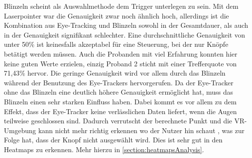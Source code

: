 Blinzeln scheint als Auswahlmethode dem Trigger unterlegen zu sein. Mit dem Laserpointer war die Genauigkeit zwar noch ähnlich hoch, allerdings ist die Kombination aus Eye-Tracking und Blinzeln sowohl in der Gesamtdauer, als auch in der Genauigkeit signifikant schlechter. Eine durchschnittliche Genauigkeit von unter 50\% ist keinesfalls akzeptabel für eine Steuerung, bei der nur Knöpfe betätigt werden müssen. Auch die Probanden mit viel Erfahrung konnten hier keine guten Werte erzielen, einzig Proband 2 sticht mit einer Trefferquote von 71,43\% hervor. Die geringe Genauigkeit wird vor allem durch das Blinzeln während der Benutzung des Eye-Trackers hervorgerufen. Da der Eye-Tracker ohne das Blinzeln eine deutlich höhere Genauigkeit ermöglicht hat, muss das Blinzeln einen sehr starken Einfluss haben. Dabei kommt es vor allem zu dem Effekt, dass der Eye-Tracker keine verlässlichen Daten liefert, wenn die Augen teilweise geschlossen sind. Dadurch verrutscht der berechnete Punkt und die VR-Umgebung kann nicht mehr richtig erkennen wo der Nutzer hin schaut , was zur Folge hat, dass der Knopf nicht ausgewählt wird. Dies ist sehr gut in den Heatmaps zu erkennen. Mehr hierzu in \autoref{section:heatmapsAnalysis}. 

